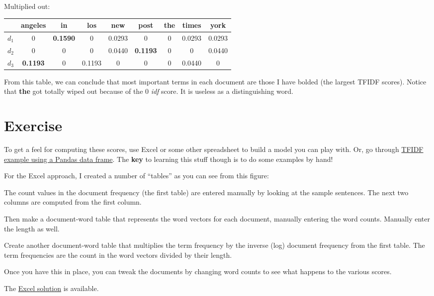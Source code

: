 \documentclass[10pt]{article}
\begin{document}
\noindent Multiplied out:
 
 \begin{table}[H]
\begin{center}
\begin{tabular}{c|c|c|c|c|c|c|c|c}
 & angeles & in & los & new & post & the & times & york\\
\hline
$d_1$ & 0 & {\bf 0.1590} & 0 & 0.0293 & 0 & 0 & 0.0293 & 0.0293 \\
$d_2$ & 0 & 0 & 0 & 0.0440 & {\bf 0.1193} & 0 & 0 & 0.0440\\
$d_3$ & {\bf 0.1193} & 0 & 0.1193 & 0 & 0 & 0 & 0.0440 & 0\\
\end{tabular}
\end{center}
\label{default}
\end{table}%

From this table, we can conclude that most important terms in each document are those I have bolded (the largest TFIDF scores). Notice that {\bf the} got totally wiped out because of the 0 {\em idf} score. It is useless as a distinguishing word.

\section{Exercise}

To get a feel for computing these scores, use Excel or some other spreadsheet to build a model you can play with. Or, go through \href{https://github.com/parrt/msds692/blob/master/notes/tfidf.ipynb}{TFIDF example using a Pandas data frame}.  The {\bf key} to learning this stuff though is to do some examples by hand!

For the Excel approach, I created a number of ``tables'' as you can see from this figure:

\begin{figure}[H]
\begin{center}
\label{default}
\end{center}
\end{figure}

The count values in the document frequency (the first table) are entered manually by looking at the sample sentences. The next two columns are computed from the first column.

Then make a document-word table that represents the word vectors for each document, manually entering the word counts. Manually enter the length as well.

Create another document-word table that multiplies the term frequency by the inverse (log) document frequency from the first table. The term frequencies are the count in the word vectors divided by their length.

Once you have this in place, you can tweak the documents by changing word counts to see what happens to the various scores.

The \href{https://github.com/parrt/msds692/raw/master/notes/tfidf.xlsx}{Excel solution} is available.
\end{document}
